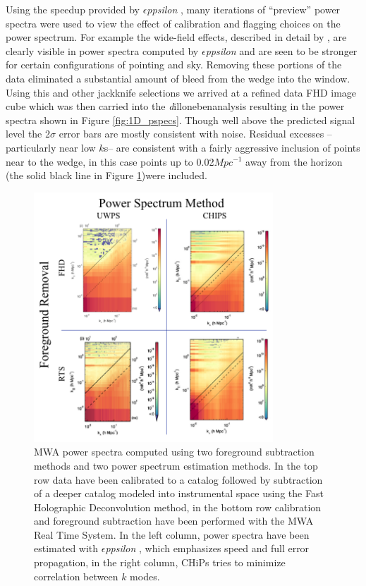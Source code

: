 \documentclass[preprint]{aastex}
\def\eppsilon{{\it $\epsilon$ppsilon }}
\def\implicitcov{{\emph dilloneben}}
\begin{document}
Using the speedup provided by \eppsilon, many iterations of ``preview'' power spectra were used to view the effect of calibration and flagging choices on the power spectrum. For example the wide-field effects, described in detail by \cite{2015arXiv150207596T}, are clearly visible in power spectra computed by \eppsilon and are seen to be stronger for certain configurations of pointing and sky. Removing these portions of the data eliminated a substantial amount of bleed from the wedge into the window.  Using this and other jackknife selections we arrived at a refined data FHD image cube which was then carried into the \implicitcov analysis resulting in the power spectra shown in Figure \ref{fig:1D_pspecs}.   Though well above the predicted signal level the 2$\sigma$ error bars are mostly consistent with noise.   Residual excesses --particularly near low $k$s--  are consistent with a fairly aggressive inclusion of points near to the wedge, in this case points up to 0.02$Mpc^{-1}$ away from the horizon (the solid black line in Figure \ref{fig:pspec_compare})were included.

\begin{figure}[h!]
\begin{center}
\includegraphics[width=0.8\textwidth]{figures/MWA_PS_compare/MWA_PS_compare.png}
\caption{MWA power spectra computed using two foreground subtraction methods and two power spectrum estimation methods.  In the top row data have been calibrated to a catalog followed by subtraction of a deeper catalog modeled into instrumental space using the Fast Holographic Deconvolution method, in the bottom row calibration and foreground subtraction have been performed with the MWA Real Time System.  In the left column, power spectra have been estimated with \eppsilon, which emphasizes speed and full error propagation, in the right column, CHiPs tries to minimize correlation between $k$ modes.\label{fig:pspec_compare}}
\end{center}
\end{figure}
\end{document}

